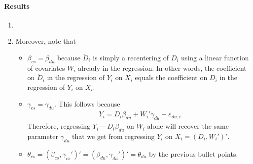 \documentclass[12pt]{article}
\theoremstyle{plain}
\theoremstyle{definition}
\theoremstyle{remark}
\newcommand{\sumin}{\sum^n_{i=1}}
\begin{document}



\clearpage

\clearpage
\paragraph{Results}
\begin{enumerate}

  \item


  \item
    Moreover, note that
    \begin{itemize}
      \item ${\beta}_{cs}=\beta_{du}$
        because $\ddot{D}_i$ is simply a recentering of $D_i$ using
        a linear function of covariates $W_i$ already in the regression.
        In other words,
        the coefficient on $\ddot{D}_i$ in the regression of $Y_i$ on
        $\ddot{X}_i$ equals the coefficient on $D_i$ in the regression of
        $Y_i$ on $X_i$.
      \item $\gamma_{cs}=\gamma_{du}$.
        This follows because
        \begin{align*}
          Y_i = D_i\beta_{du}+W_i'\gamma_{du} + \varepsilon_{du,i}
        \end{align*}
        Therefore, regressing $Y_i-D_i\beta_{du}$ on $W_i$ alone will
        recover the same parameter $\gamma_{du}$ that we get from regressing
        $Y_i$ on $X_i=(D_i,W_i')'$.
      \item
        $\theta_{cs}=(\beta_{cs},\gamma_{cs}')'=(\beta_{du},\gamma_{du}')'=\theta_{du}$
        by the previous bullet points.
    \end{itemize}


\end{enumerate}
\end{document}
